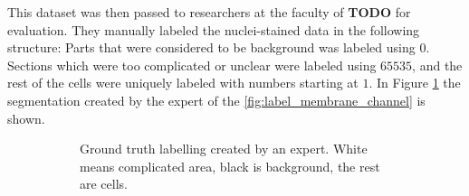 \documentclass[
  digital,     %
  oneside,     %
  nosansbold,  %
  nocolorbold, %
  lof,         %
  lot,         %
]{fithesis4}
\begin{document}
This dataset was then passed to researchers at the faculty of \textbf{TODO} for
evaluation. They manually labeled the nuclei-stained data in the following
structure: Parts that were considered to be background was labeled using $0$.
Sections which were too complicated or unclear were labeled using $65535$, and
the rest of the cells were uniquely labeled with numbers starting at $1$. In
Figure \ref{fig:label_ground_truth} the segmentation created by the expert of
the \ref{fig:label_membrane_channel} is shown.

\begin{figure}
    \centering
    \begin{subfigure}[t]{0.4\textwidth}
        \centering
        \caption{Ground truth labelling created by an expert. White means
        complicated area, black is background, the rest are cells.}
        \label{fig:label_ground_truth}
    \end{subfigure}
    \hfill
    \begin{subfigure}[t]{0.4\textwidth}
        \centering

\end{subfigure}
\end{figure}
\end{document}
